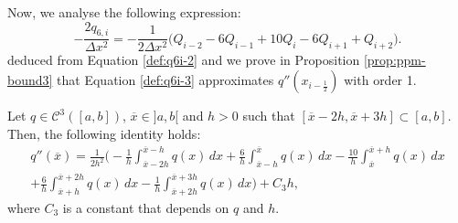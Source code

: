 Now, we analyse the following expression:
\begin{equation}
	\label{def:q6i-3}
	-\frac{2q_{6,i}}{\Delta x^2} = 
	-\frac{1}{2\Delta x^2} \bigg( Q_{i-2} - 6Q_{i-1} + 10Q_{i} -6Q_{i+1}  + Q_{i+2} \bigg).
\end{equation}
deduced from Equation \eqref{def:q6i-2}
and we prove in Proposition \ref{prop:ppm-bound3} that Equation \eqref{def:q6i-3}
approximates $q''(x_{i-\frac{1}{2}})$ with order 1.
\begin{prop}
	\label{prop:ppm-bound3}
	Let $q \in \mathcal{C}^{3}([a,b])$, $\overline{x} \in ]a,b[$
	and $h>0$ such that $ [\overline{x}-2h,\overline{x}+3h] \subset [a,b]$.
	Then, the following identity holds:
	\begin{equation}
		\begin{split}
		\label{prop:ppm-bound3-eq1}
		q''(\overline{x} ) = \frac{1}{2h^2}
		\bigg(-\frac{1}{h} \int_{\overline{x}-2h}^{\overline{x}-h} q(x) \,dx 
		      +\frac{6}{h}\int_{\overline{x}-h}^{\overline{x}} q(x) \,dx   
		      -\frac{10}{h}\int_{\overline{x}}^{\overline{x}+h} q(x) \,dx  \\ 
		      +\frac{6}{h} \int_{\overline{x}+h}^{\overline{x}+2h} q(x) \,dx   
		      -\frac{1}{h} \int_{\overline{x}+2h}^{\overline{x}+3h} q(x) \,dx   
		\bigg) + C_3h,
		\end{split}
	\end{equation}
	where $C_3$ is a constant that depends on $q$ and $h$.
\end{prop}

